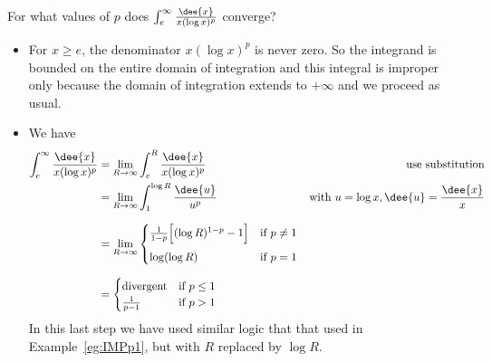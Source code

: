 \goodbreak
\begin{eg}\label{eg:IMPp11}
For what values of $p$ does $\int_e^\infty\frac{\dee{x}}{x(\log x)^p}$
converge?

\soln
\begin{itemize}
 \item For $x\ge e$, the denominator $x(\log x)^p$ is never zero.
So the integrand is bounded on the entire domain of integration
and this integral is improper only because the domain of integration
extends to $+\infty$ and we proceed as usual.
\item We have
\begin{align*}
\int_e^\infty\frac{\dee{x}}{x(\log x)^p}
&=\lim_{R\rightarrow \infty} \int_e^R\frac{\dee{x}}{x(\log x)^p}
&\text{use substitution} \\
&=\lim_{R\rightarrow \infty} \int_1^{\log R}\frac{\dee{u}}{u^p}
&\text{with }u=\log x,\dee{u}=\frac{\dee{x}}{x} \\[0.1in]
&=\lim_{R\rightarrow\infty}
   \begin{cases}
       \frac{1}{1-p}\Big[(\log R)^{1-p}-1\Big] & \text{if } p\ne 1 \\[0.1in]
       \log(\log R) & \text{if } p=1
   \end{cases} \\[0.1in]
&=\begin{cases}
   \text{divergent} & \text {if } p\le 1 \\
   \frac{1}{p-1} & \text{if } p>1
  \end{cases}
\end{align*}
In this last step we have used similar logic that that used in Example~\ref{eg:IMPp1}, but
with $R$ replaced by $\log R$.
\end{itemize}
\end{eg}

